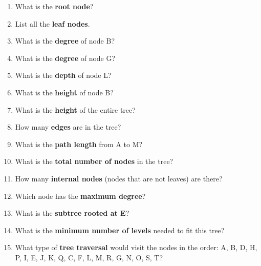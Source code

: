 \documentclass[11pt, letterpaper]{article}
\begin{document}
\begin{enumerate}[leftmargin=*, label=\textbf{\arabic*.}]
  \item What is the \textbf{root node}?
  \item List all the \textbf{leaf nodes}.
  \item What is the \textbf{degree} of node B?
  \item What is the \textbf{degree} of node G?
  \item What is the \textbf{depth} of node L?
  \item What is the \textbf{height} of node B?
  \item What is the \textbf{height} of the entire tree?
  \item How many \textbf{edges} are in the tree?
  \item What is the \textbf{path length} from A to M?
  \item What is the \textbf{total number of nodes} in the tree?
  \item How many \textbf{internal nodes} (nodes that are not leaves) are there?
  \item Which node has the \textbf{maximum degree}?
  \item What is the \textbf{subtree rooted at E}?
  \item What is the \textbf{minimum number of levels} needed to fit this tree?
  \item What type of \textbf{tree traversal} would visit the nodes in the order: A, B, D, H, P, I, E, J, K, Q, C, F, L, M, R, G, N, O, S, T?
\end{enumerate}
\end{document}
